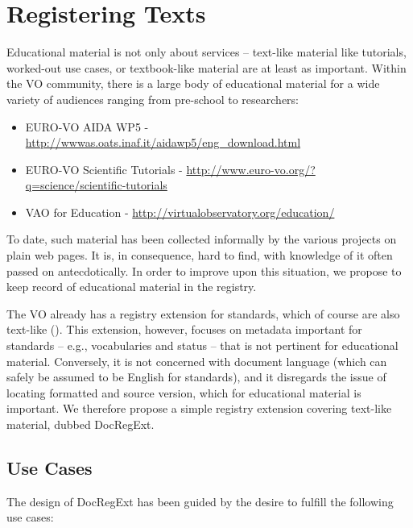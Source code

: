 \documentclass{ivoa}
\begin{document}
\section{Registering Texts}

\label{sect:regext}

Educational material is not only about services – text-like material
like tutorials, worked-out use cases, or textbook-like material are at
least as important.  Within the VO community, there is a large body of
educational material for a wide variety of audiences ranging from pre-school to
researchers:

\begin{itemize}

\item EURO-VO AIDA WP5 - \url{http://wwwas.oats.inaf.it/aidawp5/eng_download.html}

\item EURO-VO Scientific Tutorials - \url{http://www.euro-vo.org/?q=science/scientific-tutorials}

\item VAO for Education - \url{http://virtualobservatory.org/education/}

\end{itemize}


To date, such material has been collected informally by the various
projects on plain web pages.  It is, in consequence, hard to find, with
knowledge of it often passed on antecdotically. In order to improve upon 
this situation, we
propose to keep record of educational material in the registry.

The VO already has a registry extension for standards, which of
course are also text-like (\citep{2012ivoa.spec.0508H}).  This extension,
however, focuses on metadata important for standards – e.g.,
vocabularies and status – that is not pertinent for educational
material.  Conversely, it is not concerned with document language (which
can safely be assumed to be English for standards), and it disregards
the issue of locating formatted and source version, which for educational
material is important.  We therefore propose a simple registry extension
covering text-like material, dubbed DocRegExt.


\subsection{Use Cases}

\label{sect:regext-usecases}

The design of DocRegExt has been guided by the desire to fulfill the
following use cases:
\end{document}
